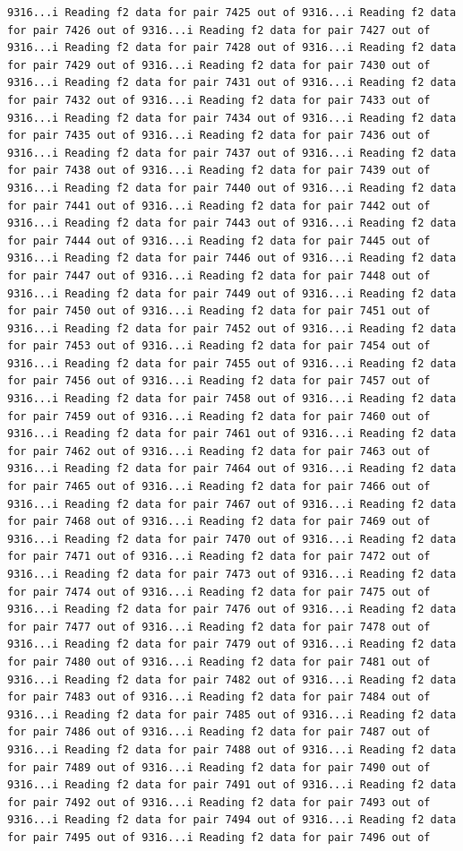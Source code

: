 \documentclass[
]{article}
\begin{document}
\begin{verbatim}
9316...i Reading f2 data for pair 7425 out of 9316...i Reading f2 data for pair 7426 out of 9316...i Reading f2 data for pair 7427 out of 9316...i Reading f2 data for pair 7428 out of 9316...i Reading f2 data for pair 7429 out of 9316...i Reading f2 data for pair 7430 out of 9316...i Reading f2 data for pair 7431 out of 9316...i Reading f2 data for pair 7432 out of 9316...i Reading f2 data for pair 7433 out of 9316...i Reading f2 data for pair 7434 out of 9316...i Reading f2 data for pair 7435 out of 9316...i Reading f2 data for pair 7436 out of 9316...i Reading f2 data for pair 7437 out of 9316...i Reading f2 data for pair 7438 out of 9316...i Reading f2 data for pair 7439 out of 9316...i Reading f2 data for pair 7440 out of 9316...i Reading f2 data for pair 7441 out of 9316...i Reading f2 data for pair 7442 out of 9316...i Reading f2 data for pair 7443 out of 9316...i Reading f2 data for pair 7444 out of 9316...i Reading f2 data for pair 7445 out of 9316...i Reading f2 data for pair 7446 out of 9316...i Reading f2 data for pair 7447 out of 9316...i Reading f2 data for pair 7448 out of 9316...i Reading f2 data for pair 7449 out of 9316...i Reading f2 data for pair 7450 out of 9316...i Reading f2 data for pair 7451 out of 9316...i Reading f2 data for pair 7452 out of 9316...i Reading f2 data for pair 7453 out of 9316...i Reading f2 data for pair 7454 out of 9316...i Reading f2 data for pair 7455 out of 9316...i Reading f2 data for pair 7456 out of 9316...i Reading f2 data for pair 7457 out of 9316...i Reading f2 data for pair 7458 out of 9316...i Reading f2 data for pair 7459 out of 9316...i Reading f2 data for pair 7460 out of 9316...i Reading f2 data for pair 7461 out of 9316...i Reading f2 data for pair 7462 out of 9316...i Reading f2 data for pair 7463 out of 9316...i Reading f2 data for pair 7464 out of 9316...i Reading f2 data for pair 7465 out of 9316...i Reading f2 data for pair 7466 out of 9316...i Reading f2 data for pair 7467 out of 9316...i Reading f2 data for pair 7468 out of 9316...i Reading f2 data for pair 7469 out of 9316...i Reading f2 data for pair 7470 out of 9316...i Reading f2 data for pair 7471 out of 9316...i Reading f2 data for pair 7472 out of 9316...i Reading f2 data for pair 7473 out of 9316...i Reading f2 data for pair 7474 out of 9316...i Reading f2 data for pair 7475 out of 9316...i Reading f2 data for pair 7476 out of 9316...i Reading f2 data for pair 7477 out of 9316...i Reading f2 data for pair 7478 out of 9316...i Reading f2 data for pair 7479 out of 9316...i Reading f2 data for pair 7480 out of 9316...i Reading f2 data for pair 7481 out of 9316...i Reading f2 data for pair 7482 out of 9316...i Reading f2 data for pair 7483 out of 9316...i Reading f2 data for pair 7484 out of 9316...i Reading f2 data for pair 7485 out of 9316...i Reading f2 data for pair 7486 out of 9316...i Reading f2 data for pair 7487 out of 9316...i Reading f2 data for pair 7488 out of 9316...i Reading f2 data for pair 7489 out of 9316...i Reading f2 data for pair 7490 out of 9316...i Reading f2 data for pair 7491 out of 9316...i Reading f2 data for pair 7492 out of 9316...i Reading f2 data for pair 7493 out of 9316...i Reading f2 data for pair 7494 out of 9316...i Reading f2 data for pair 7495 out of 9316...i Reading f2 data for pair 7496 out of 
\end{verbatim}
\end{document}
